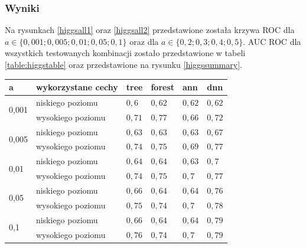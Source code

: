 \subsubsection{Wyniki}
Na rysunkach \ref{higgsall1} oraz \ref{higgsall2} przedstawione została krzywa ROC dla $a\in\{0,001; 0,005; 0,01; 0,05; 0,1\}$  oraz dla $a\in\{0,2; 0,3; 0,4; 0,5\}$. AUC ROC dla wszystkich testowanych kombinacji zostało przedstawione w tabeli \ref{table:higgstable} oraz przedstawione na rysunku \ref{higgssummary}.


\begin{table}[]
\centering
\begin{tabular}{|l|l|l|l|l|l|}
\hline
a                      & wykorzystane cechy       & tree & forest & ann & dnn \\ \hline

\multirow{2}{*}{0,001} & niskiego poziomu   & $ 0,6 $ & $ 0,62 $ & $ 0,62 $ &$ 0,62 $ \\ \cline{2-6} 
                       & wysokiego poziomu & $ 0,71 $ & $ 0,77 $ & $ 0,66 $ &$ 0,72 $ \\ \hline
                       
\multirow{2}{*}{0,005} & niskiego poziomu  & $ 0,63 $ & $ 0,63 $ & $ 0,63 $ &$ 0,67 $ \\ \cline{2-6} 
                       & wysokiego poziomu & $ 0,74 $ & $ 0,75 $ & $ 0,69 $ &$ 0,77 $ \\ \hline
                       
\multirow{2}{*}{0,01}  & niskiego poziomu  & $ 0,64 $ & $ 0,64 $ & $ 0,63 $ &$ 0,7 $ \\ \cline{2-6} 
                       & wysokiego poziomu & $ 0,74 $ & $ 0,75 $ & $ 0,7 $ &$ 0,77 $ \\ \hline
                       
\multirow{2}{*}{0,05}  & niskiego poziomu  & $ 0,66 $ & $ 0,64 $ & $ 0,64 $ &$ 0,76 $ \\ \cline{2-6} 
                       & wysokiego poziomu &  $ 0,75 $ & $ 0,74 $ & $ 0,7 $ &$ 0,78 $ \\ \hline
                       
\multirow{2}{*}{0,1}   & niskiego poziomu  &  $ 0,66 $ & $ 0,64 $ & $ 0,64 $ &$ 0,79 $ \\ \cline{2-6} 
                       & wysokiego poziomu &  $ 0,76 $ & $ 0,74 $ & $ 0,7 $ &$ 0,79 $ \\ \hline
                       

\end{tabular}
\end{table}
